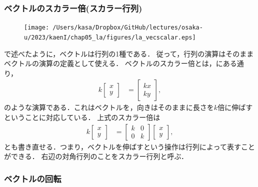 \subsubsection{ベクトルのスカラー倍(スカラー行列)\label{sec:vec_scalar}}
%
\begin{figure}
  \centering
  \vspace*{-\intextsep}
  \texttt{[image: /Users/kasa/Dropbox/GitHub/lectures/osaka-u/2023/kaenI/chap05\_la/figures/la\_vecscalar.eps]}
\end{figure}
%
で述べたように，ベクトルは行列の1種である．
従って，行列の演算はそのままベクトルの演算の定義として使える．
ベクトルのスカラー倍とは，にある通り，
%
\begin{align}
k\left[\begin{array}{c}
x\\
y
\end{array}\right] & =\left[\begin{array}{c}
kx\\
ky
\end{array}\right],
\end{align}
%
のような演算である．これはベクトルを，向きはそのままに長さを$k$倍に伸ばすということに対応している．
上式のスカラー倍は
%
\begin{align}
k\left[\begin{array}{c}
x\\
y
\end{array}\right] & =\left[\begin{array}{cc}
k & 0\\
0 & k
\end{array}\right]\left[\begin{array}{c}
x\\
y
\end{array}\right], 
\end{align}
とも書き直せる．つまり，ベクトルを伸ばすという操作は行列によって表すことができる．
右辺の対角行列のことをスカラー行列と呼ぶ．
%
\subsubsection{ベクトルの回転\label{sec:vec_rot}}
%

